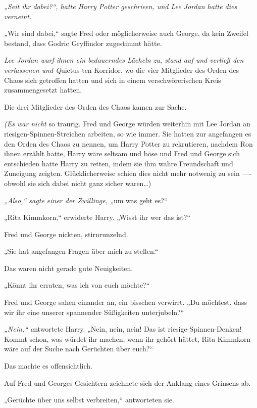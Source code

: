 {\emph{„Seit ihr dabei?“, hatte Harry Potter geschrieen, und Lee Jordan hatte dies verneint.}

\emph{„}Wir sind dabei,“ sagte Fred oder möglicherweise auch George, da kein Zweifel bestand, dass Godric Gryffindor zugestimmt hätte.

\emph{Lee Jordan warf ihnen ein bedauerndes Lächeln zu, stand auf und verließ den verlassenen und Q}uietus-ten Korridor, wo die vier Mitglieder des Orden des Chaos sich getroffen hatten und sich in einem verschwörerischen Kreis zusammengesetzt hatten.

Die drei Mitglieder des Orden des Chaos kamen zur Sache.

\emph{(Es war nicht} so traurig. Fred und George würden weiterhin mit Lee Jordan an riesigen-Spinnen-Streichen arbeiten, so wie immer. Sie hatten zur angefangen es den Orden des Chaos zu nennen, um Harry Potter zu rekrutieren, nachdem Ron ihnen erzählt hatte, Harry wäre seltsam und böse und Fred und George sich entschieden hatte Harry zu retten, indem sie ihm wahre Freundschaft und Zuneigung zeigten. Glücklicherweise schien dies nicht mehr notwenig zu sein ---- obwohl sie sich dabei nicht ganz sicher waren…)

\emph{„Also,“ sagte einer der Zwillinge, „}um was geht es?“

„Rita Kimmkorn,“ erwiderte Harry. „Wisst ihr wer das ist?“

Fred und George nickten, stirnrunzelnd.

„Sie hat angefangen Fragen über mich zu stellen.“

Das waren nicht gerade gute Neuigkeiten.

„Könnt ihr erraten, was ich von euch möchte?“

Fred und George sahen einander an, ein bisschen verwirrt. „Du möchtest, dass wir ihr eine unserer spannender Süßigkeiten unterjubeln?“

\emph{„Nein,“ a}ntwortete Harry. „Nein, nein, nein! Das ist riesige-Spinnen-Denken! Kommt schon, was würdet ihr machen, wenn ihr gehört hättet, Rita Kimmkorn wäre auf der Suche nach Gerüchten über euch?“

Das machte es offensichtlich.

Auf Fred und Georges Gesichtern zeichnete sich der Anklang eines Grinsens ab.

„Gerüchte über uns selbst verbreiten,“ antworteten sie.

}
